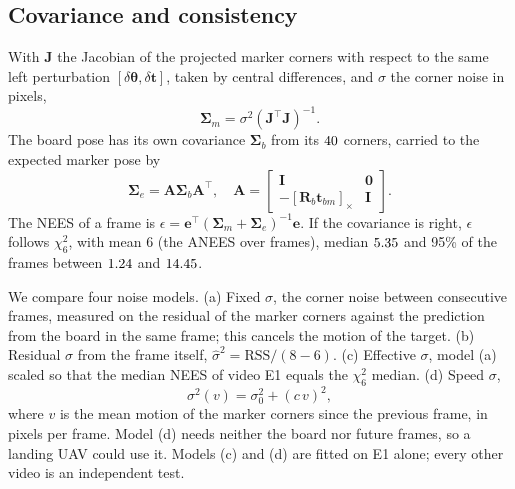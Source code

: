 \documentclass[conference]{IEEEtran}
\newcommand{\vect}[1]{\mathbf{#1}}
\begin{document}
\subsection{Covariance and consistency}
With $\vect{J}$ the Jacobian of the projected marker corners with respect to the same left
perturbation $[\delta\boldsymbol{\theta}, \delta\vect{t}]$, taken by central differences, and $\sigma$
the corner noise in pixels,
\begin{equation}
\boldsymbol{\Sigma}_m = \sigma^2 (\vect{J}^\top\vect{J})^{-1}.
\end{equation}
The board pose has its own covariance $\boldsymbol{\Sigma}_b$ from its $40$ corners, carried to
the expected marker pose by
\begin{equation}
\boldsymbol{\Sigma}_e = \vect{A}\boldsymbol{\Sigma}_b\vect{A}^\top, \quad
\vect{A} = \begin{bmatrix} \vect{I} & \vect{0} \\ -[\vect{R}_b\vect{t}_{bm}]_\times & \vect{I} \end{bmatrix}.
\end{equation}
The NEES of a frame is $\epsilon = \vect{e}^\top(\boldsymbol{\Sigma}_m + \boldsymbol{\Sigma}_e)^{-1}\vect{e}$.
If the covariance is right, $\epsilon$ follows $\chi^2_6$, with mean 6 (the ANEES over frames), median
$5.35$ and 95\% of the frames between $1.24$ and $14.45$.

We compare four noise models. (a) Fixed $\sigma$, the corner noise between consecutive frames,
measured on the residual of the marker corners against the prediction from the board in the same
frame; this cancels the motion of the target. (b) Residual $\sigma$ from the frame itself,
$\hat\sigma^2 = \mathrm{RSS}/(8-6)$. (c) Effective $\sigma$, model (a) scaled so that the median NEES of
video E1 equals the $\chi^2_6$ median. (d) Speed $\sigma$,
\begin{equation}
\sigma^2(v) = \sigma_0^2 + (c\,v)^2,
\end{equation}
where $v$ is the mean motion of the marker corners since the previous frame, in pixels per frame. Model
(d) needs neither the board nor future frames, so a landing UAV could use it. Models (c) and (d) are
fitted on E1 alone; every other video is an independent test.
\end{document}
